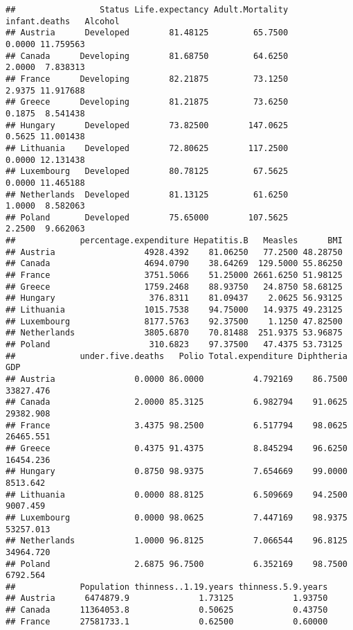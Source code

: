 \documentclass[
]{article}
\begin{document}
\begin{verbatim}
##                 Status Life.expectancy Adult.Mortality infant.deaths   Alcohol
## Austria      Developed        81.48125         65.7500        0.0000 11.759563
## Canada      Developing        81.68750         64.6250        2.0000  7.838313
## France      Developing        82.21875         73.1250        2.9375 11.917688
## Greece      Developing        81.21875         73.6250        0.1875  8.541438
## Hungary      Developed        73.82500        147.0625        0.5625 11.001438
## Lithuania    Developed        72.80625        117.2500        0.0000 12.131438
## Luxembourg   Developed        80.78125         67.5625        0.0000 11.465188
## Netherlands  Developed        81.13125         61.6250        1.0000  8.582063
## Poland       Developed        75.65000        107.5625        2.2500  9.662063
##             percentage.expenditure Hepatitis.B   Measles      BMI
## Austria                  4928.4392    81.06250   77.2500 48.28750
## Canada                   4694.0790    38.64269  129.5000 55.86250
## France                   3751.5066    51.25000 2661.6250 51.98125
## Greece                   1759.2468    88.93750   24.8750 58.68125
## Hungary                   376.8311    81.09437    2.0625 56.93125
## Lithuania                1015.7538    94.75000   14.9375 49.23125
## Luxembourg               8177.5763    92.37500    1.1250 47.82500
## Netherlands              3805.6870    70.81488  251.9375 53.96875
## Poland                    310.6823    97.37500   47.4375 53.73125
##             under.five.deaths   Polio Total.expenditure Diphtheria       GDP
## Austria                0.0000 86.0000          4.792169    86.7500 33827.476
## Canada                 2.0000 85.3125          6.982794    91.0625 29382.908
## France                 3.4375 98.2500          6.517794    98.0625 26465.551
## Greece                 0.4375 91.4375          8.845294    96.6250 16454.236
## Hungary                0.8750 98.9375          7.654669    99.0000  8513.642
## Lithuania              0.0000 88.8125          6.509669    94.2500  9007.459
## Luxembourg             0.0000 98.0625          7.447169    98.9375 53257.013
## Netherlands            1.0000 96.8125          7.066544    96.8125 34964.720
## Poland                 2.6875 96.7500          6.352169    98.7500  6792.564
##             Population thinness..1.19.years thinness.5.9.years
## Austria      6474879.9              1.73125            1.93750
## Canada      11364053.8              0.50625            0.43750
## France      27581733.1              0.62500            0.60000

\end{verbatim}
\end{document}

